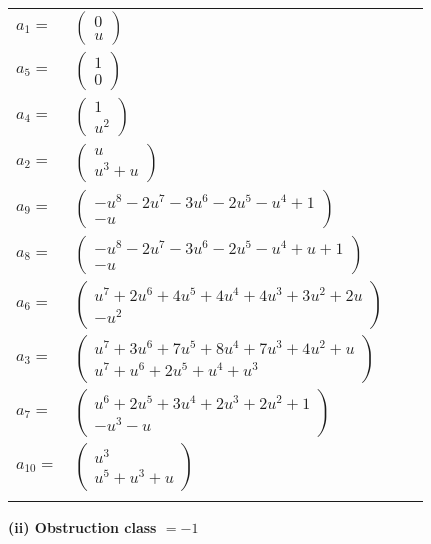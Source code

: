 \documentclass[1p]{elsarticle_modified}
\theoremstyle{definition}
\begin{document}
\begin{tabular}{m{7pt} m{180pt} m{7pt} m{180pt} }
\flushright $a_{1}=$&$\begin{pmatrix}0\\u\end{pmatrix}$ \\
\flushright $a_{5}=$&$\begin{pmatrix}1\\0\end{pmatrix}$ \\
\flushright $a_{4}=$&$\begin{pmatrix}1\\u^2\end{pmatrix}$ \\
\flushright $a_{2}=$&$\begin{pmatrix}u\\u^3+u\end{pmatrix}$ \\
\flushright $a_{9}=$&$\begin{pmatrix}- u^8-2 u^7-3 u^6-2 u^5- u^4+1\\- u\end{pmatrix}$ \\
\flushright $a_{8}=$&$\begin{pmatrix}- u^8-2 u^7-3 u^6-2 u^5- u^4+u+1\\- u\end{pmatrix}$ \\
\flushright $a_{6}=$&$\begin{pmatrix}u^7+2 u^6+4 u^5+4 u^4+4 u^3+3 u^2+2 u\\- u^2\end{pmatrix}$ \\
\flushright $a_{3}=$&$\begin{pmatrix}u^7+3 u^6+7 u^5+8 u^4+7 u^3+4 u^2+u\\u^7+u^6+2 u^5+u^4+u^3\end{pmatrix}$ \\
\flushright $a_{7}=$&$\begin{pmatrix}u^6+2 u^5+3 u^4+2 u^3+2 u^2+1\\- u^3- u\end{pmatrix}$ \\
\flushright $a_{10}=$&$\begin{pmatrix}u^3\\u^5+u^3+u\end{pmatrix}$\\&\end{tabular}
\flushleft \textbf{(ii) Obstruction class $= -1$}\\~\\
\end{document}
